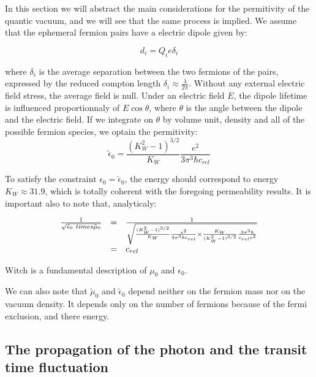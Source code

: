 \documentclass[9pt, a4, twoside]{article}
\begin{document}
In this section we will abstract the main considerations for the permitivity of the quantic vacuum, and we will see that the same process is implied. We assume that the ephemeral fermion pairs have a electric dipole given by:

\[d_i=Q_ie\delta_i\]

where $\delta_i$ is the average separation between the two fermions of the pairs, expressed by the reduced compton length $\delta_i\approx \frac \lambda {2\pi}$. Without any external electric field stress, the average field is null. Under an electric field $E$, the dipole lifetime is influenced proportionnaly of $E\cos \theta$, where $\theta$ is the angle between the dipole and the electric field. If we integrate on $\theta$ by volume unit, density and all of the possible fermion species, we optain the permitivity:
\[\tilde \epsilon_0 = \frac {(K^2_W - 1)^{3/2}} {K_W} \frac{e^2}{3\pi^3\hbar c_{rel}}\]

To satisfy the constraint $\epsilon_0=\tilde \epsilon_0$, the energy should correspond to energy $K_W\approx 31.9$, which is totally coherent with the foregoing permeability results. It is important also to note that, analyticaly:

\[
\begin {array}{r c l}
\frac 1 {\sqrt {\tilde \epsilon_0 \ times \tilde \mu_0}} & = & \frac 1 {\sqrt {\frac {(K^2_W - 1)^{3/2}} {K_W} \frac{e^2}{3\pi^3\hbar c_{rel}}\times\frac {K_W} { (K^2_W - 1)^{3/2}}\frac {3\pi^3\hbar}{c_{rel}e^2}}}\\
 & = & c_{rel}\\
\end {array}
\]

Witch is a fundamental description of $\mu_0$ and $\epsilon_0$.

We can also note that $\tilde \mu_0$ and $\tilde \epsilon_0$ depend neither on the fermion mass nor on the vacuum density. It depends only on the number of fermions because of the fermi exclusion, and there energy.

\subsection {The propagation of the photon and the transit time fluctuation}
\end{document}
